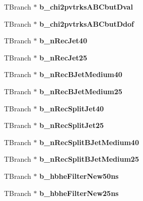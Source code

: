 \begin{DoxyCompactItemize}
T\+Branch $\ast$ {\bfseries b\+\_\+chi2pvtrks\+A\+B\+Cbut\+Dval}
\item 
\hypertarget{classMiniTree_ae541a663374892e40dddb8e1f93436e0}{}\label{classMiniTree_ae541a663374892e40dddb8e1f93436e0} 
T\+Branch $\ast$ {\bfseries b\+\_\+chi2pvtrks\+A\+B\+Cbut\+Ddof}
\item 
\hypertarget{classMiniTree_a638b2efc847c434b74d373875121dec0}{}\label{classMiniTree_a638b2efc847c434b74d373875121dec0} 
T\+Branch $\ast$ {\bfseries b\+\_\+n\+Rec\+Jet40}
\item 
\hypertarget{classMiniTree_a492dfab100555c59657347dd119b6a30}{}\label{classMiniTree_a492dfab100555c59657347dd119b6a30} 
T\+Branch $\ast$ {\bfseries b\+\_\+n\+Rec\+Jet25}
\item 
\hypertarget{classMiniTree_a57555b35ab956293257b865135f37063}{}\label{classMiniTree_a57555b35ab956293257b865135f37063} 
T\+Branch $\ast$ {\bfseries b\+\_\+n\+Rec\+B\+Jet\+Medium40}
\item 
\hypertarget{classMiniTree_a4d118b3b5d338a7f31fb19662041d827}{}\label{classMiniTree_a4d118b3b5d338a7f31fb19662041d827} 
T\+Branch $\ast$ {\bfseries b\+\_\+n\+Rec\+B\+Jet\+Medium25}
\item 
\hypertarget{classMiniTree_a1e486a7b644cd1dbb0f7335afd7fe7d5}{}\label{classMiniTree_a1e486a7b644cd1dbb0f7335afd7fe7d5} 
T\+Branch $\ast$ {\bfseries b\+\_\+n\+Rec\+Split\+Jet40}
\item 
\hypertarget{classMiniTree_a0a1a371f1893a1df6a715a36ff72779e}{}\label{classMiniTree_a0a1a371f1893a1df6a715a36ff72779e} 
T\+Branch $\ast$ {\bfseries b\+\_\+n\+Rec\+Split\+Jet25}
\item 
\hypertarget{classMiniTree_aa59342f19c12f49bd7b0f81052fc9c35}{}\label{classMiniTree_aa59342f19c12f49bd7b0f81052fc9c35} 
T\+Branch $\ast$ {\bfseries b\+\_\+n\+Rec\+Split\+B\+Jet\+Medium40}
\item 
\hypertarget{classMiniTree_a1ce748b5fc1c6b894a3fb3d3ab403f3f}{}\label{classMiniTree_a1ce748b5fc1c6b894a3fb3d3ab403f3f} 
T\+Branch $\ast$ {\bfseries b\+\_\+n\+Rec\+Split\+B\+Jet\+Medium25}
\item 
\hypertarget{classMiniTree_abb5d877a9bc1b86a638d70cd0d29823e}{}\label{classMiniTree_abb5d877a9bc1b86a638d70cd0d29823e} 
T\+Branch $\ast$ {\bfseries b\+\_\+hbhe\+Filter\+New50ns}
\item 
\hypertarget{classMiniTree_a6d486d5e4d5a973bb3ebfabaedb6845e}{}\label{classMiniTree_a6d486d5e4d5a973bb3ebfabaedb6845e} 
T\+Branch $\ast$ {\bfseries b\+\_\+hbhe\+Filter\+New25ns}
\item 

\end{DoxyCompactItemize}
